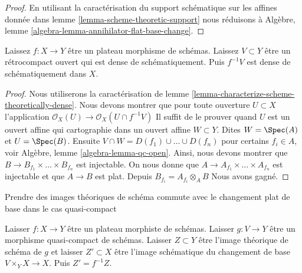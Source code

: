 \begin{proof}
En utilisant la caractérisation du support schématique sur les affines donnée dans lemme \ref{lemma-scheme-theoretic-support} nous réduisons à Algèbre, lemme \ref{algebra-lemma-annihilator-flat-base-change}.
\end{proof}

\begin{lemma}

\label{lemma-flat-morphism-scheme-theoretically-dense-open}
Laissez $f : X \to Y$ être un plateau morphisme de schémas. Laissez $V \subset Y$ être un rétrocompact ouvert qui est dense de schématiquement. Puis $f^{-1}V$ est dense de schématiquement dans $X$.
\end{lemma}

\begin{proof}

Nous utiliserons la caractérisation de lemme \ref{lemma-characterize-scheme-theoretically-dense}. Nous devons montrer que pour toute ouverture $U \subset X$ l'application
$\mathcal{O}_X(U) \to \mathcal{O}_X(U \cap f^{-1}V)$ Il suffit de le prouver quand $U$ est un ouvert affine qui cartographie dans un ouvert affine $W \subset Y$. Dites $W = \Spec(A)$ et $U = \Spec(B)$. Ensuite $V \cap W = D(f_1) \cup \ldots \cup D(f_n)$ pour certains
$f_i \in A$, voir Algèbre, lemme \ref{algebra-lemma-qc-open}. Ainsi, nous devons montrer que
$B \to B_{f_1} \times \ldots \times B_{f_n}$ est injectable. On nous donne que $A \to A_{f_1} \times \ldots \times A_{f_n}$ est injectable et que $A \to B$ est plat. Depuis $B_{f_i} = A_{f_i} \otimes_A B$ Nous avons gagné.

\end{proof}

\begin{lemma}

\label{lemma-flat-base-change-scheme-theoretic-image}

\begin{slogan}
Prendre des images théoriques de schéma commute avec le changement plat de base dans le cas quasi-compact
\end{slogan}
Laisser $f : X \to Y$ être un plateau morphiste de schémas. Laisser $g : V \to Y$ être un morphisme quasi-compact de schémas. Laisser $Z \subset Y$ être l'image théorique de schéma de $g$ et laisser $Z' \subset X$ être l'image schématique du changement de base $V \times_Y X \to X$. Puis $Z' = f^{-1}Z$.
\end{lemma}

